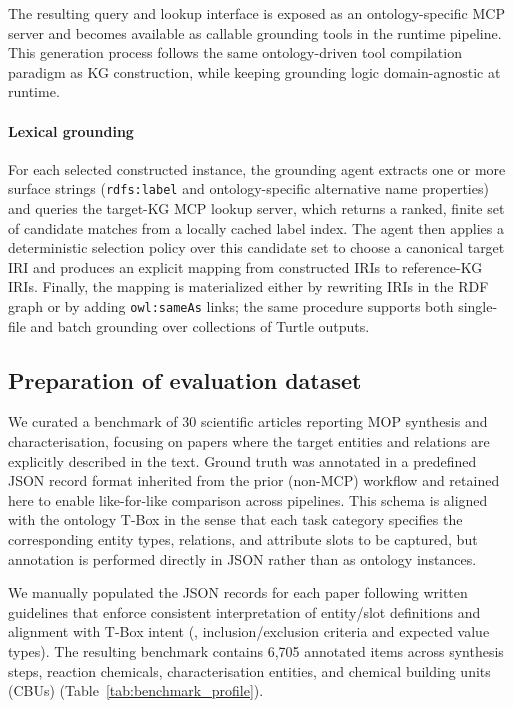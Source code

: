 The resulting query and lookup interface is exposed as an ontology-specific MCP server and becomes available as callable grounding tools in the runtime pipeline.
This generation process follows the same ontology-driven tool compilation paradigm as KG construction, while keeping grounding logic domain-agnostic at runtime.

\paragraph{Lexical grounding}

For each selected constructed instance, the grounding agent extracts one or more surface strings (\eg \texttt{rdfs:label} and ontology-specific alternative name properties) and queries the target-KG MCP lookup server, which returns a ranked, finite set of candidate matches from a locally cached label index.
The agent then applies a deterministic selection policy over this candidate set to choose a canonical target IRI and produces an explicit mapping from constructed IRIs to reference-KG IRIs.
Finally, the mapping is materialized either by rewriting IRIs in the RDF graph or by adding \texttt{owl:sameAs} links; the same procedure supports both single-file and batch grounding over collections of Turtle outputs.
 


\subsection{Preparation of evaluation dataset}\label{subsec:dataset}

We curated a benchmark of 30 scientific articles reporting MOP synthesis and
characterisation, focusing on papers where the target entities and relations are
explicitly described in the text. Ground truth was annotated in a predefined JSON
record format inherited from the prior (non-MCP) workflow and retained here to
enable like-for-like comparison across pipelines. This schema is aligned with the
ontology T-Box in the sense that each task category specifies the corresponding
entity types, relations, and attribute slots to be captured, but annotation is
performed directly in JSON rather than as ontology instances.

We manually populated the JSON records for
each paper following written guidelines that enforce consistent interpretation of
entity/slot definitions and alignment with T-Box intent (\eg, inclusion/exclusion
criteria and expected value types). The resulting benchmark contains 6{,}705
annotated items across synthesis steps, reaction chemicals, characterisation
entities, and chemical building units (CBUs) (Table~\ref{tab:benchmark_profile}).

